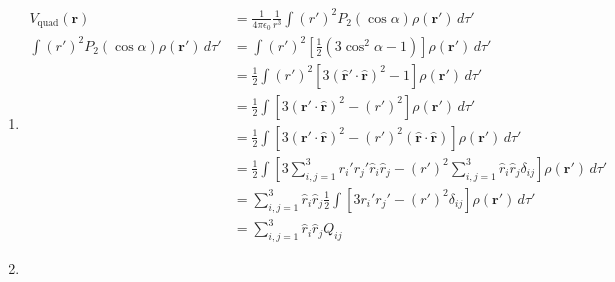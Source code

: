 \documentclass{article}
\renewcommand{\vec}[1]{\boldsymbol{\mathbf{#1}}}
\newcommand{\uvec}[1]{\hat{\vec{#1}}}
\newcommand{\ke}{\frac{1}{4 \pi \epsilon_0}}
\begin{document}
\subsection{}

\begin{enumerate}
  \item

        \begin{align*}
          V_\text{quad}(\vec{r})                                & = \ke \frac{1}{r^3} \int (r')^2 P_2(\cos \alpha) \rho(\vec{r}') \,d \tau'                                                                                                \\
          \int (r')^2 P_2(\cos \alpha) \rho(\vec{r}') \,d \tau' & = \int (r')^2 \left[ \frac{1}{2} (3 \cos^2 \alpha - 1) \right] \rho(\vec{r}') \,d \tau'                                                                                  \\
                                                                & = \frac{1}{2} \int (r')^2 [3 (\uvec{r}' \cdot \uvec{r})^2 - 1] \rho(\vec{r}') \,d \tau'                                                                                  \\
                                                                & = \frac{1}{2} \int [3 (\vec{r}' \cdot \uvec{r})^2 - (r')^2] \rho(\vec{r}') \,d \tau'                                                                                     \\
                                                                & = \frac{1}{2} \int [3 (\vec{r}' \cdot \uvec{r})^2 - (r')^2 (\uvec{r} \cdot \uvec{r})] \rho(\vec{r}') \,d \tau'                                                           \\
                                                                & = \frac{1}{2} \int \left[ 3 \sum_{i, j = 1}^3 r_i' r_j' \hat{r}_i \hat{r}_j - (r')^2 \sum_{i, j = 1}^3 \hat{r}_i \hat{r}_j \delta_{i j} \right] \rho(\vec{r}') \,d \tau' \\
                                                                & = \sum_{i, j = 1}^3 \hat{r}_i \hat{r}_j \frac{1}{2} \int [3 r_i' r_j' - (r')^2 \delta_{i j}] \rho(\vec{r}') \,d \tau'                                                    \\
                                                                & = \sum_{i, j = 1}^3 \hat{r}_i \hat{r}_j Q_{i j}
        \end{align*}

  \item


\end{enumerate}
\end{document}
